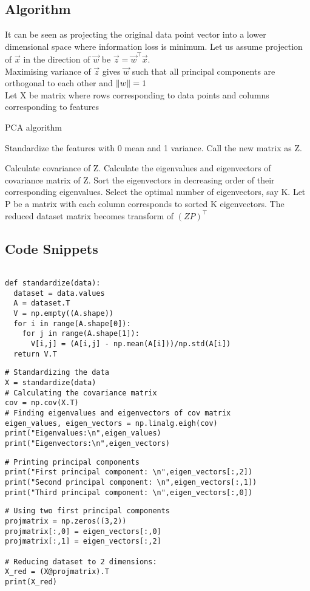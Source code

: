 \documentclass[12pt,letterpaper, onecolumn]{exam}
\begin{document}
\subsection*{Algorithm}
It can be seen as projecting the original data point vector into a lower dimensional space where information loss is minimum.
Let us assume projection of $\vec{x}$ in the direction of $\vec{w}$ be $\vec{z} = \vec{w}^\top \vec{x}$.
\\Maximising variance of $\vec{z}$ gives $\vec{w}$ such that all principal components are orthogonal to each other and $\lVert w\rVert=1$  
\\
Let X be matrix where rows corresponding to data points and columns corresponding to features
\begin{algorithm}
\caption{PCA algorithm}\label{cap}
\begin{algorithmic}

\State Standardize the features with 0 mean and 1 variance. Call the new matrix as Z.



\State Calculate covariance of Z.
\State Calculate the eigenvalues and eigenvectors of covariance matrix of Z.
\State Sort the eigenvectors in decreasing order of their corresponding eigenvalues.
\State Select the optimal number of eigenvectors, say K.
\State Let P be a matrix with each column corresponds to sorted K eigenvectors. The reduced dataset matrix becomes transform of $(ZP)^\top$


\end{algorithmic}
\end{algorithm}

\subsection*{Code Snippets}
\begin{lstlisting}

def standardize(data):
  dataset = data.values
  A = dataset.T
  V = np.empty((A.shape))
  for i in range(A.shape[0]):
    for j in range(A.shape[1]):
      V[i,j] = (A[i,j] - np.mean(A[i]))/np.std(A[i])
  return V.T
\end{lstlisting} 
\begin{lstlisting}
# Standardizing the data
X = standardize(data)
# Calculating the covariance matrix
cov = np.cov(X.T)
# Finding eigenvalues and eigenvectors of cov matrix
eigen_values, eigen_vectors = np.linalg.eigh(cov)
print("Eigenvalues:\n",eigen_values)
print("Eigenvectors:\n",eigen_vectors)
\end{lstlisting}
\begin{lstlisting}
# Printing principal components
print("First principal component: \n",eigen_vectors[:,2])
print("Second principal component: \n",eigen_vectors[:,1])
print("Third principal component: \n",eigen_vectors[:,0])
\end{lstlisting}
\begin{lstlisting}
# Using two first principal components 
projmatrix = np.zeros((3,2))
projmatrix[:,0] = eigen_vectors[:,0]
projmatrix[:,1] = eigen_vectors[:,2]

# Reducing dataset to 2 dimensions:
X_red = (X@projmatrix).T
print(X_red)
\end{lstlisting}
\end{document}
